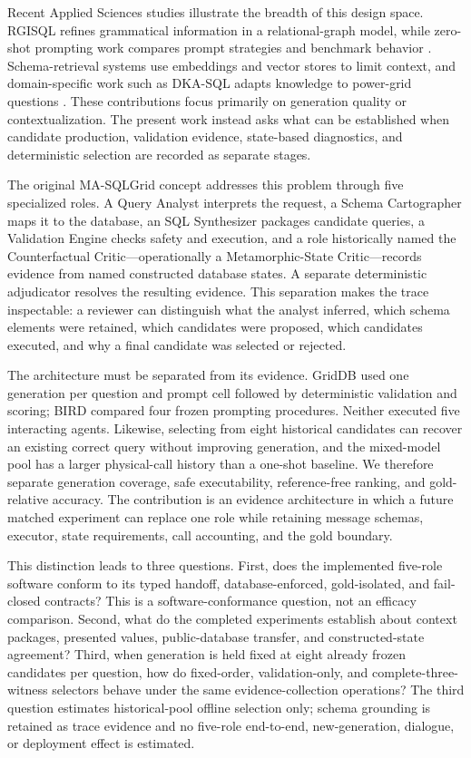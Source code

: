 \documentclass[applsci,article,submit,moreauthors]{Definitions/mdpi}
\newcommand{\masql}{MA-SQLGrid}
\begin{document}
Recent Applied Sciences studies illustrate the breadth of this design space. RGISQL refines grammatical information in a relational-graph model, while zero-shot prompting work compares prompt strategies and benchmark behavior \cite{li2024rgisql,zhou2025zeroshot}. Schema-retrieval systems use embeddings and vector stores to limit context, and domain-specific work such as DKA-SQL adapts knowledge to power-grid questions \cite{bozdemir2026schema,bian2025dkasql}. These contributions focus primarily on generation quality or contextualization. The present work instead asks what can be established when candidate production, validation evidence, state-based diagnostics, and deterministic selection are recorded as separate stages.

The original \masql{} concept addresses this problem through five specialized roles. A Query Analyst interprets the request, a Schema Cartographer maps it to the database, an SQL Synthesizer packages candidate queries, a Validation Engine checks safety and execution, and a role historically named the Counterfactual Critic---operationally a Metamorphic-State Critic---records evidence from named constructed database states. A separate deterministic adjudicator resolves the resulting evidence. This separation makes the trace inspectable: a reviewer can distinguish what the analyst inferred, which schema elements were retained, which candidates were proposed, which candidates executed, and why a final candidate was selected or rejected.

The architecture must be separated from its evidence. GridDB used one generation per question and prompt cell followed by deterministic validation and scoring; BIRD compared four frozen prompting procedures. Neither executed five interacting agents. Likewise, selecting from eight historical candidates can recover an existing correct query without improving generation, and the mixed-model pool has a larger physical-call history than a one-shot baseline. We therefore separate generation coverage, safe executability, reference-free ranking, and gold-relative accuracy. The contribution is an evidence architecture in which a future matched experiment can replace one role while retaining message schemas, executor, state requirements, call accounting, and the gold boundary.

This distinction leads to three questions. First, does the implemented five-role software conform to its typed handoff, database-enforced, gold-isolated, and fail-closed contracts? This is a software-conformance question, not an efficacy comparison. Second, what do the completed experiments establish about context packages, presented values, public-database transfer, and constructed-state agreement? Third, when generation is held fixed at eight already frozen candidates per question, how do fixed-order, validation-only, and complete-three-witness selectors behave under the same evidence-collection operations? The third question estimates historical-pool offline selection only; schema grounding is retained as trace evidence and no five-role end-to-end, new-generation, dialogue, or deployment effect is estimated.
\end{document}
